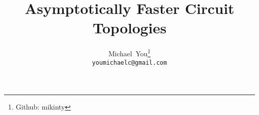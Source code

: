 \usepackage{arxiv}
\usepackage{util}

\usepackage[utf8]{inputenc} %
\usepackage[T1]{fontenc}    %
\usepackage{hyperref}       %
\usepackage{url}            %
\usepackage{booktabs}       %
\usepackage{amsfonts}       %
\usepackage{nicefrac}       %
\usepackage{microtype}      %
\usepackage{lipsum}		%
\usepackage{graphicx}
\usepackage{natbib}
\usepackage{doi}



\title{Asymptotically Faster Circuit Topologies}


\author{
  Michael~You\thanks{Github: mikinty} \\
  \texttt{youmichaelc@gmail.com}
}

\renewcommand{\headeright}{Michael You}
\renewcommand{\undertitle}{}
\renewcommand{\shorttitle}{Fast Circuit Topologies}

